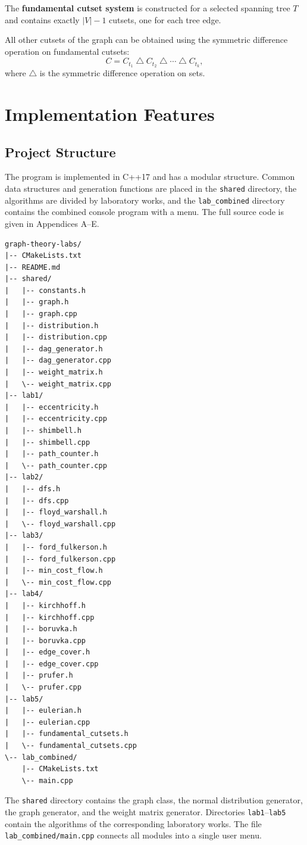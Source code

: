 \documentclass[a4paper,final]{article}
\begin{document}
The \textbf{fundamental cutset system} is constructed for a selected spanning tree $T$ and contains exactly $|V|-1$ cutsets, one for each tree edge.

All other cutsets of the graph can be obtained using the symmetric difference operation on fundamental cutsets:
\[
C = C_{t_1} \mathbin{\triangle} C_{t_2} \mathbin{\triangle} \cdots \mathbin{\triangle} C_{t_k},
\]
where $\triangle$ is the symmetric difference operation on sets.

\clearpage
\section{Implementation Features}

\subsection{Project Structure}

The program is implemented in C++17 and has a modular structure. Common data structures and generation functions are placed in the \texttt{shared} directory, the algorithms are divided by laboratory works, and the \texttt{lab\_combined} directory contains the combined console program with a menu. The full source code is given in Appendices A--E.

\begin{lstlisting}[caption={Project structure}, label={lst:project-structure}]
graph-theory-labs/
|-- CMakeLists.txt
|-- README.md
|-- shared/
|   |-- constants.h
|   |-- graph.h
|   |-- graph.cpp
|   |-- distribution.h
|   |-- distribution.cpp
|   |-- dag_generator.h
|   |-- dag_generator.cpp
|   |-- weight_matrix.h
|   \-- weight_matrix.cpp
|-- lab1/
|   |-- eccentricity.h
|   |-- eccentricity.cpp
|   |-- shimbell.h
|   |-- shimbell.cpp
|   |-- path_counter.h
|   \-- path_counter.cpp
|-- lab2/
|   |-- dfs.h
|   |-- dfs.cpp
|   |-- floyd_warshall.h
|   \-- floyd_warshall.cpp
|-- lab3/
|   |-- ford_fulkerson.h
|   |-- ford_fulkerson.cpp
|   |-- min_cost_flow.h
|   \-- min_cost_flow.cpp
|-- lab4/
|   |-- kirchhoff.h
|   |-- kirchhoff.cpp
|   |-- boruvka.h
|   |-- boruvka.cpp
|   |-- edge_cover.h
|   |-- edge_cover.cpp
|   |-- prufer.h
|   \-- prufer.cpp
|-- lab5/
|   |-- eulerian.h
|   |-- eulerian.cpp
|   |-- fundamental_cutsets.h
|   \-- fundamental_cutsets.cpp
\-- lab_combined/
    |-- CMakeLists.txt
    \-- main.cpp
\end{lstlisting}

The \texttt{shared} directory contains the graph class, the normal distribution generator, the graph generator, and the weight matrix generator. Directories \texttt{lab1}--\texttt{lab5} contain the algorithms of the corresponding laboratory works. The file \texttt{lab\_combined/main.cpp} connects all modules into a single user menu.
\end{document}
